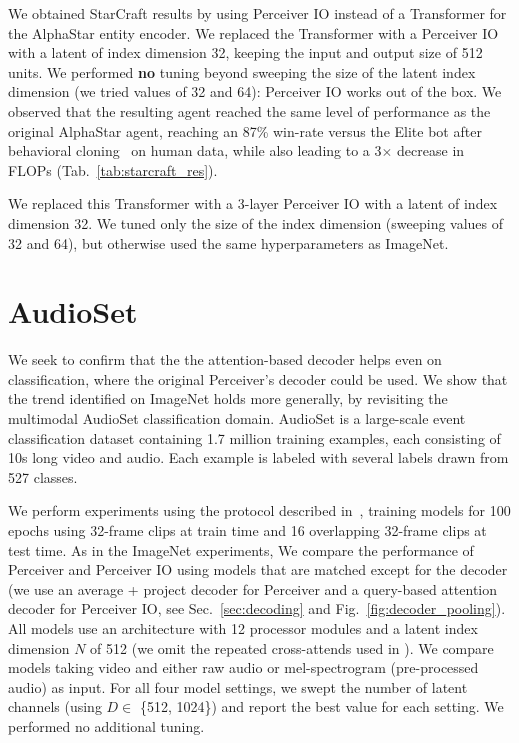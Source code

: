 \documentclass{article} %
\newcommand{\ourmodel}{Perceiver IO\xspace}
\begin{document}
We obtained StarCraft  results by using \ourmodel{} instead of a Transformer for the AlphaStar entity encoder. We replaced the Transformer with a \ourmodel{} with a latent of index dimension 32, keeping the input and output size of 512 units. We performed \textbf{no} tuning beyond sweeping the size of the latent index dimension (we tried values of 32 and 64): 
\ourmodel{} works out of the box. We observed that the resulting agent reached the same level of performance as the original AlphaStar agent, reaching an 87\% win-rate versus the Elite bot after behavioral cloning~\citep{pomerleau1989alvinn} on human data, while also leading to a 3$\times$ decrease in FLOPs (Tab.~\ref{tab:starcraft_res}).

We replaced this Transformer with a 3-layer \ourmodel{} with a latent of index dimension 32. We tuned only the size of the index dimension (sweeping values of 32 and 64), but otherwise used the same hyperparameters as ImageNet.

\section{AudioSet}
\label{sec:audioset_appendix}

We seek to confirm that the the attention-based decoder helps even on classification, where the original Perceiver's decoder could be used. We show that the trend identified on ImageNet holds more generally, by revisiting the multimodal AudioSet classification domain. AudioSet is a large-scale event classification dataset containing 1.7 million training examples, each consisting of 10s long video and audio. Each example is labeled with several labels drawn from 527 classes. 

We perform experiments using the protocol described in~\cite{jaegle2021perceiver}, training models for 100 epochs using 32-frame clips at train time and 16 overlapping 32-frame clips at test time. As in the ImageNet experiments, We compare the performance of Perceiver and \ourmodel{} using models that are matched except for the decoder (we use an average + project decoder for Perceiver and a query-based attention decoder for \ourmodel{}, see Sec.~\ref{sec:decoding} and Fig.~\ref{fig:decoder_pooling}). All models use an architecture with 12 processor modules and a latent index dimension $N$ of 512 (we omit the repeated cross-attends used in \cite{jaegle2021perceiver}). We compare models taking video and either raw audio or mel-spectrogram (pre-processed audio) as input. For all four model settings, we swept the number of latent channels (using $D \in $ \{512, 1024\}) and report the best value for each setting. We performed no additional tuning.
\end{document}
